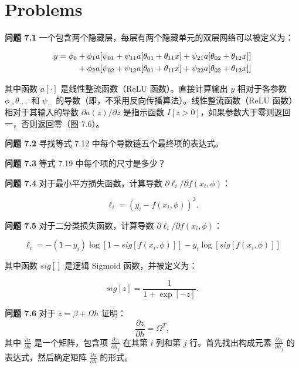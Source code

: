 \section{Problems}  
\textbf{问题 7.1} 一个包含两个隐藏层，每层有两个隐藏单元的双层网络可以被定义为：

\begin{align}
y = \phi_0 &+ \phi_1a[\psi_{01} + \psi_{11}a[\theta_{01} + \theta_{11}x] + \psi_{21}a[\theta_{02} + \theta_{12}x]] \notag \\
&+ \phi_2a[\psi_{02} + \psi_{12}a[\theta_{01} + \theta_{11}x] + \psi_{22}a[\theta_{02} + \theta_{12}x]] 
\end{align} 


其中函数 \(a[\cdot]\) 是线性整流函数（ReLU 函数）。直接计算输出 \(y\) 相对于各参数 \(\phi_\cdot, \theta_{\cdot\cdot},\) 和 \(\psi_{\cdot\cdot}\) 的导数（即，不采用反向传播算法）。线性整流函数（ReLU 函数）相对于其输入的导数 \(\partial a(z)/\partial z\) 是指示函数 \(I[z > 0]\)，如果参数大于零则返回一，否则返回零（图 7.6）。

\textbf{问题 7.2} 寻找等式 7.12 中每个导数链五个最终项的表达式。

\textbf{问题 7.3} 等式 7.19 中每个项的尺寸是多少？

\textbf{问题 7.4} 对于最小平方损失函数，计算导数 \(\partial\ell_i/\partial f(x_i, \phi)\)：

\begin{equation}
\ell_i = (y_i - f(x_i, \phi))^2. 
\end{equation}

\textbf{问题 7.5} 对于二分类损失函数，计算导数 \(\partial\ell_i/\partial f(x_i, \phi)\)：

\begin{equation}
\ell_i = -(1 - y_i)\log [ 1 - sig[f(x_i, \phi)] ] - y_i \log [sig[f(x_i, \phi)] ] 
\end{equation}

其中函数 \(sig[]\) 是逻辑 Sigmoid 函数，并被定义为：

\begin{equation}
sig[z] = \frac{1}{1 + \exp[-z]}. 
\end{equation}


\textbf{问题 7.6} 对于 \(z = \beta + \Omega h\) 证明：
\begin{equation*}
\frac{\partial z}{\partial h} = \Omega^T,
\end{equation*}
其中 \(\frac{\partial z}{\partial h}\) 是一个矩阵，包含项 \(\frac{\partial z_i}{\partial h_j}\) 在其第 \(i\) 列和第 \(j\) 行。首先找出构成元素 \(\frac{\partial z_i}{\partial h_j}\) 的表达式，然后确定矩阵 \(\frac{\partial z}{\partial h}\) 的形式。


